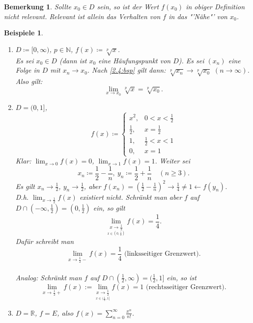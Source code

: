 \documentclass[12pt]{extreport} %
\newcommand{\N}{\mathbb{N}}
\newcommand{\R}{\mathbb{R}}
\theoremstyle{named}
\theoremstyle{itshape}
\theoremstyle{normal}
\newtheorem*{beispiele}{Beispiele}
\newtheorem*{bemerkung}{Bemerkung}
\begin{document}
\begin{bemerkung}
	Sollte $x_{0} \in D$ sein, so ist der Wert $f(x_{0})$ in obiger Definition nicht relevant. Relevant ist allein das Verhalten von $f$ in das "'Nähe"' von $x_{0}$.	
\end{bemerkung}

 
\begin{beispiele} ~\
	\begin{enumerate}
		\item $D \coloneqq [0, \infty)$, $p \in \N$, $f(x) \coloneqq \sqrt[p]{x}$. \\
		        Es sei $x_{0} \in D$ (dann ist $x_{0}$ eine Häufungspunkt von $D$). Es sei $(x_{n})$ eine Folge in $D$ mit 
		        $x_{n} \rightarrow x_{0}$. Nach \ref{2.4:bsp} gilt dann: $\sqrt[p]{x_{n}} \rightarrow \sqrt[p]{x_{0}}$ $(n \to \infty)$. Also gilt:
			$$ \lim_{x \rightarrow x_{0}} \sqrt[p]{x} = \sqrt[p]{x_{0}}. $$
		\item $D = (0, 1]$,
			$$ f(x) \coloneqq \begin{cases} x^{2}, & 0 < x < \frac{1}{2} \\ \frac{1}{2}, & x = \frac{1}{2} \\ 1, & \frac{1}{2} < x < 1 \\ 0, & x = 1 \end{cases} $$
			Klar: $\lim_{x \rightarrow 0} f(x)=0$, $\lim_{x \rightarrow 1} f(x) = 1$. Weiter sei
			$$ x_{n} \coloneqq \frac{1}{2} - \frac{1}{n},  ~  y_{n} \coloneqq \frac{1}{2} + \frac{1}{n} \quad (n \geq 3). $$
			Es gilt $x_{n} \rightarrow \frac{1}{2}$, $y_{n} \rightarrow \frac{1}{2}$, aber 
			$f(x_n) = \left( \frac{1}{2} - \frac{1}{n} \right)^{2} \rightarrow \frac{1}{4} \neq 1 \leftarrow f(y_{n})$. \\
			D.h. $\lim_{x \rightarrow \frac{1}{2}} f(x)$ existiert nicht. Schränkt man aber $f$ auf $D\cap (-\infty,\frac{1}{2})=(0,\frac{1}{2})$ ein, so gilt 
			$$\lim_{\underset{x \in (0, \frac{1}{2})}{x \rightarrow \frac{1}{2}}} f(x) = \frac{1}{4}.$$
			Dafür schreibt man 
			$$ \lim_{x \rightarrow \frac{1}{2}-} f(x) = \frac{1}{4} \text{ (linksseitiger Grenzwert)}. $$ \\
			Analog: Schränkt man $f$ auf $D\cap (\frac{1}{2}, \infty)=(\frac{1}{2},1]$ ein, so ist
			$$ \lim_{x \rightarrow \frac{1}{2}+} f(x) := \lim_{\underset{x \in (\frac{1}{2}, 1]}{x \rightarrow \frac{1}{2}}} f(x) = 1 
			\text{ (rechtsseitiger Grenzwert)}. $$ 
		\item $D = \R$, $f = E$, also $f(x) = \sum_{n=0}^{\infty} \frac{x^{n}}{n!}$. \\

\end{enumerate}
\end{beispiele}
\end{document}
